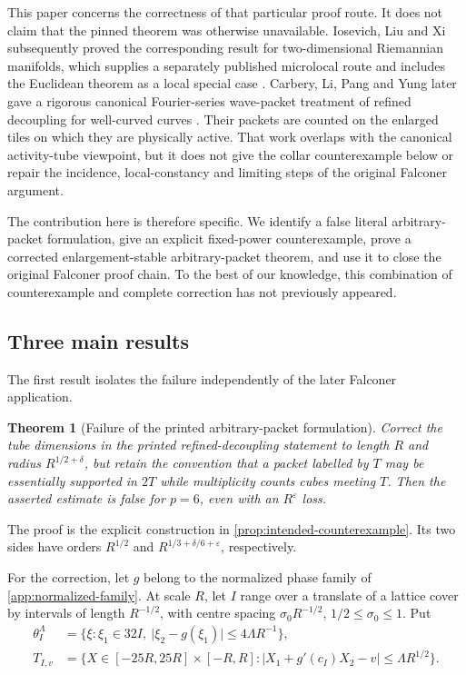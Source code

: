 \documentclass[11pt,letterpaper]{amsart}
\newtheorem{theorem}{Theorem}[section]
\newcommand{\eps}{\varepsilon}
\newcommand{\abs}[1]{\lvert#1\rvert}
\begin{document}
This paper concerns the correctness of that particular proof route.  It does
not claim that the pinned theorem was otherwise unavailable.  Iosevich, Liu
and Xi subsequently proved the corresponding result for two-dimensional
Riemannian manifolds, which supplies a separately published microlocal route
and includes the Euclidean theorem as a local special case \cite{ILX}.
Carbery, Li, Pang and Yung later gave a rigorous canonical Fourier-series
wave-packet treatment of refined decoupling for well-curved curves
\cite{CLPY}.  Their packets are counted on the enlarged tiles on which they
are physically active.  That work overlaps with the canonical
activity-tube viewpoint, but it does not give the collar counterexample
below or repair the incidence, local-constancy and limiting steps of the
original Falconer argument.

The contribution here is therefore specific.  We identify a false literal
arbitrary-packet formulation, give an explicit fixed-power counterexample,
prove a corrected enlargement-stable arbitrary-packet theorem, and use it
to close the original Falconer proof chain.  To the best of our knowledge,
this combination of counterexample and complete correction has not
previously appeared.

\subsection*{Three main results}

The first result isolates the failure independently of the later Falconer
application.

\begin{theorem}[Failure of the printed arbitrary-packet formulation]
\label{thm:false-formulation}
Correct the tube dimensions in the printed refined-decoupling statement to
length \(R\) and radius \(R^{1/2+\delta}\), but retain the convention that a
packet labelled by \(T\) may be essentially supported in \(2T\) while
multiplicity counts cubes meeting \(T\).  Then the asserted estimate is
false for \(p=6\), even with an \(R^\eps\) loss.
\end{theorem}

The proof is the explicit construction in
\cref{prop:intended-counterexample}.  Its two sides have orders
\(R^{1/2}\) and \(R^{1/3+\delta/6+\eps}\), respectively.

For the correction, let \(g\) belong to the normalized phase family of
\cref{app:normalized-family}.  At scale \(R\), let \(I\) range over a
translate of a lattice cover by intervals of length \(R^{-1/2}\), with
centre spacing \(\sigma_0R^{-1/2}\), \(1/2\le\sigma_0\le1\).  Put
\begin{align}
 \theta_I^\Lambda
 &=\{\xi:\xi_1\in32I,\
       \abs{\xi_2-g(\xi_1)}\le4\Lambda R^{-1}\},
 \label{eq:intro-cap}\\
 T_{I,v}
 &=\{X\in[-25R,25R]\times[-R,R]:
       \abs{X_1+g'(c_I)X_2-v}\le\Lambda R^{1/2}\}.
 \label{eq:intro-strip}
\end{align}
\end{document}
